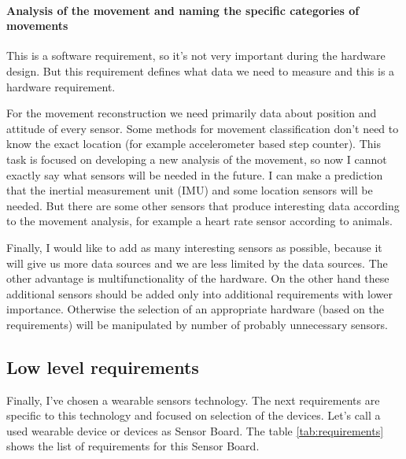 \paragraph{Analysis of the movement and naming the specific categories of movements} This is a software requirement, so it's not very important during the hardware design. But this requirement defines what data we need to measure and this is a hardware requirement.

For the movement reconstruction we need primarily data about position and attitude of every sensor. Some methods for movement classification don't need to know the exact location (for example accelerometer based step counter). This task is focused on developing a new analysis of the movement, so now I cannot exactly say what sensors will be needed in the future. I can make a prediction that the inertial measurement unit (IMU) and some location sensors will be needed. But there are some other sensors that produce interesting data according to the movement analysis, for example a heart rate sensor according to animals.

Finally, I would like to add as many interesting sensors as possible, because it will give us more data sources and we are less limited by the data sources. The other advantage is multifunctionality of the hardware. On the other hand these additional sensors should be added only into additional requirements with lower importance. Otherwise the selection of an appropriate hardware (based on the requirements) will be manipulated by number of probably unnecessary sensors.

\subsection{Low level requirements}
Finally, I've chosen a wearable sensors technology. The next requirements are specific to this technology and focused on selection of the devices. Let's call a used wearable device or devices as Sensor Board. The table \ref{tab:requirements} shows the list of requirements for this Sensor Board.

